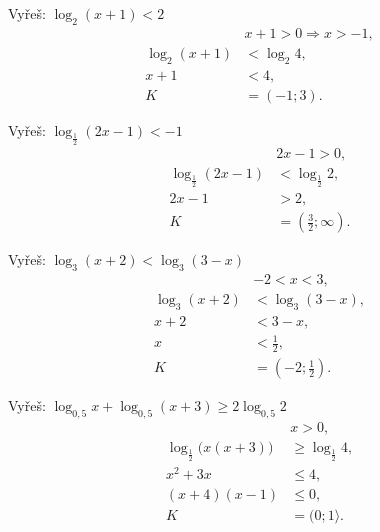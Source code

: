 \documentclass[11pt,a4paper]{article}
\begin{document}
\begin{prikladReseniBox}[title={Příklad 1}]
Vyřeš: $\displaystyle \log_2(x+1)<2$
\tcblower
\[
\begin{aligned}
&x+1>0\Longrightarrow x>-1,\\
\log_2(x+1)&<\log_2 4,\\
x+1&<4,\\
K&=(-1;3).
\end{aligned}
\]
\end{prikladReseniBox}
\begin{prikladReseniBox}[title={Příklad 2}]
Vyřeš: $\displaystyle \log_{\frac12}(2x-1)<-1$
\tcblower
\[
\begin{aligned}
&2x-1>0,\\
\log_{\frac12}(2x-1)&<\log_{\frac12}2,\\
2x-1&>2,\\
K&=\left(\frac32;\infty\right).
\end{aligned}
\]
\end{prikladReseniBox}
\begin{prikladReseniBox}[title={Příklad 3}]
Vyřeš: $\displaystyle \log_3(x+2)<\log_3(3-x)$
\tcblower
\[
\begin{aligned}
&-2<x<3,\\
\log_3(x+2)&<\log_3(3-x),\\
x+2&<3-x,\\
x&<\frac12,\\
K&=\left(-2;\frac12\right).
\end{aligned}
\]
\end{prikladReseniBox}
\begin{prikladReseniBox}[title={Příklad 4}]
Vyřeš: $\displaystyle \log_{0{,}5}x+\log_{0{,}5}(x+3)\ge2\log_{0{,}5}2$
\tcblower
\[
\begin{aligned}
&x>0,\\
\log_{\frac12}\bigl(x(x+3)\bigr)&\ge\log_{\frac12}4,\\
x^2+3x&\le4,\\
(x+4)(x-1)&\le0,\\
K&=(0;1\rangle.
\end{aligned}
\]
\end{prikladReseniBox}
\end{document}
